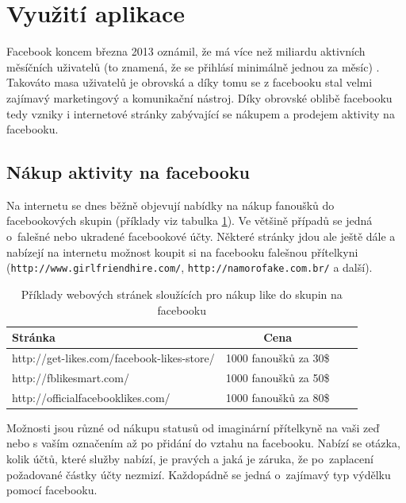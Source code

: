 \documentclass[thesis=M,czech]{FITthesis}[2013/05/10]
\begin{document}
\section{Využití aplikace}

Facebook koncem března 2013 oznámil, že má více než miliardu  aktivních měsíčních uživatelů (to znamená, že se přihlásí minimálně jednou za měsíc) \cite{web:fbMonthlyActiveUsers}. Takováto masa uživatelů je obrovská a díky tomu se z facebooku stal velmi zajímavý marketingový a komunikační nástroj. Díky obrovské oblibě facebooku tedy vzniky i internetové stránky zabývající se nákupem a prodejem aktivity na facebooku.

\subsection{Nákup aktivity na facebooku}

Na internetu se dnes běžně objevují nabídky na nákup fanoušků do facebookových skupin (příklady viz tabulka \ref{tab:likesBuy}). Ve většině případů se jedná o~falešné nebo ukradené facebookové účty. Některé stránky jdou ale ještě dále a nabízejí na internetu možnost koupit si na facebooku falešnou přítelkyni (\verb|http://www.girlfriendhire.com/|, \verb|http://namorofake.com.br/| a další). 

\begin{table}[h]
\centering
\caption{Příklady webových stránek sloužících pro nákup like do skupin na facebooku}\label{tab:likesBuy}
\begin{tabular}{| l | c | p{5cm} | c |}
	\hline
	\textbf{Stránka} & 
	\textbf{Cena} \\ \hline
	
	http://get-likes.com/facebook-likes-store/ &
	1000 fanoušků za 30\$ \\ \hline
	
	http://fblikesmart.com/ &
	1000 fanoušků za 50\$ \\ \hline
	
	http://officialfacebooklikes.com/ &
	1000 fanoušků za 80\$ \\ \hline
\end{tabular}
\end{table}

Možnosti jsou různé od nákupu statusů od imaginární přítelkyně na vaši zeď nebo s vaším označením až po přidání do vztahu na facebooku. Nabízí se otázka, kolik účtů, které služby nabízí, je pravých a jaká je záruka, že po~zaplacení požadované částky  účty nezmizí. Každopádně se jedná o~zajímavý typ výdělku pomocí facebooku.
\end{document}
